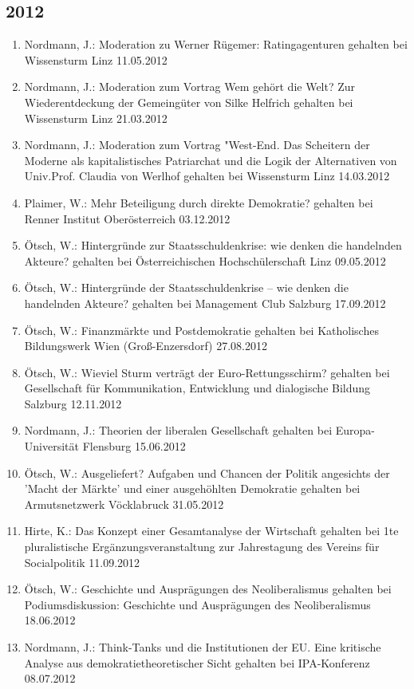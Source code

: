 \subsection*{2012}
\begin{enumerate}
	\item Nordmann, J.: Moderation zu Werner Rügemer: Ratingagenturen gehalten bei Wissensturm Linz 11.05.2012
	\item Nordmann, J.: Moderation zum Vortrag \glqq Wem gehört die Welt? Zur Wiederentdeckung der Gemeingüter\grqq{} von Silke Helfrich gehalten bei Wissensturm Linz 21.03.2012
	\item Nordmann, J.: Moderation zum Vortrag "West-End. Das Scheitern der Moderne als kapitalistisches Patriarchat und die Logik der Alternativen von Univ.Prof. Claudia von Werlhof gehalten bei Wissensturm Linz 14.03.2012
	\item Plaimer, W.: Mehr Beteiligung durch direkte Demokratie? gehalten bei Renner Institut Oberösterreich 03.12.2012
	\item Ötsch, W.: Hintergründe zur Staatsschuldenkrise: wie denken die handelnden Akteure? gehalten bei Österreichischen Hochschülerschaft Linz 09.05.2012
	\item Ötsch, W.: Hintergründe der Staatsschuldenkrise – wie denken die handelnden Akteure? gehalten bei Management Club Salzburg 17.09.2012
	\item Ötsch, W.: Finanzmärkte und Postdemokratie gehalten bei Katholisches Bildungswerk Wien (Groß-Enzersdorf) 27.08.2012
	\item Ötsch, W.: Wieviel Sturm verträgt der Euro-Rettungsschirm? gehalten bei Gesellschaft für Kommunikation, Entwicklung und dialogische Bildung Salzburg 12.11.2012
	\item Nordmann, J.: Theorien der liberalen Gesellschaft gehalten bei Europa-Universität Flensburg 15.06.2012
	\item Ötsch, W.: Ausgeliefert? Aufgaben und Chancen der Politik angesichts der 'Macht der Märkte' und einer ausgehöhlten Demokratie gehalten bei Armutsnetzwerk Vöcklabruck 31.05.2012
	\item Hirte, K.: Das Konzept einer Gesamtanalyse der Wirtschaft gehalten bei 1te pluralistische Ergänzungsveranstaltung zur Jahrestagung des Vereins für Socialpolitik 11.09.2012
	\item Ötsch, W.: Geschichte und Ausprägungen des Neoliberalismus gehalten bei Podiumsdiskussion: Geschichte und Ausprägungen des Neoliberalismus 18.06.2012
	\item Nordmann, J.: Think-Tanks und die Institutionen der EU. Eine kritische Analyse aus demokratietheoretischer Sicht gehalten bei IPA-Konferenz 08.07.2012

\end{enumerate}
